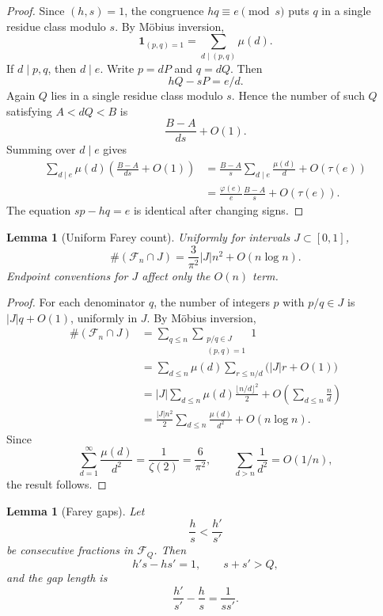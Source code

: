\documentclass[11pt]{article}
\numberwithin{equation}{section}
\newtheorem{lemma}[theorem]{Lemma}
\theoremstyle{definition}
\theoremstyle{remark}
\newcommand{\Fn}{\mathcal F_n}
\newcommand{\1}{\mathbf 1}
\begin{document}
\begin{proof}
Since $(h,s)=1$, the congruence $hq\equiv e\pmod s$ puts $q$ in a single residue class modulo $s$.  By Möbius inversion,
\[
  \1_{(p,q)=1}=\sum_{d\mid(p,q)}\mu(d).
\]
If $d\mid p,q$, then $d\mid e$.  Write $p=dP$ and $q=dQ$.  Then
\[
  hQ-sP=e/d.
\]
Again $Q$ lies in a single residue class modulo $s$.  Hence the number of such $Q$ satisfying $A<dQ<B$ is
\[
  \frac{B-A}{ds}+O(1).
\]
Summing over $d\mid e$ gives
\begin{align*}
\sum_{d\mid e}\mu(d)\left(\frac{B-A}{ds}+O(1)\right)
  &=\frac{B-A}{s}\sum_{d\mid e}\frac{\mu(d)}d+O(\tau(e))\\
  &=\frac{\varphi(e)}e\frac{B-A}{s}+O(\tau(e)).
\end{align*}
The equation $sp-hq=e$ is identical after changing signs.
\end{proof}

\begin{lemma}[Uniform Farey count]\label{lem:farey-count}
Uniformly for intervals $J\subset[0,1]$,
\[
  \#(\Fn\cap J)=\frac{3}{\pi^2}|J|n^2+O(n\log n).
\]
Endpoint conventions for $J$ affect only the $O(n)$ term.
\end{lemma}

\begin{proof}
For each denominator $q$, the number of integers $p$ with $p/q\in J$ is $|J|q+O(1)$, uniformly in $J$.  By Möbius inversion,
\begin{align*}
\#(\Fn\cap J)
  &=\sum_{q\le n}\sum_{\substack{p/q\in J\\(p,q)=1}}1\\
  &=\sum_{d\le n}\mu(d)\sum_{r\le n/d}\bigl(|J|r+O(1)\bigr)\\
  &=|J|\sum_{d\le n}\mu(d)\frac{\lfloor n/d\rfloor^2}{2}
      +O\left(\sum_{d\le n}\frac nd\right)\\
  &=\frac{|J|n^2}{2}\sum_{d\le n}\frac{\mu(d)}{d^2}+O(n\log n).
\end{align*}
Since
\[
  \sum_{d=1}^{\infty}\frac{\mu(d)}{d^2}=\frac1{\zeta(2)}=\frac6{\pi^2},
  \qquad
  \sum_{d>n}\frac1{d^2}=O(1/n),
\]
the result follows.
\end{proof}

\begin{lemma}[Farey gaps]\label{lem:farey-gaps}
Let
\[
  \frac hs<\frac{h'}{s'}
\]
be consecutive fractions in $\mathcal F_Q$.  Then
\[
  h's-hs'=1,
  \qquad s+s'>Q,
\]
and the gap length is
\[
  \frac{h'}{s'}-\frac hs=\frac1{ss'}.
\]
\end{lemma}
\end{document}
